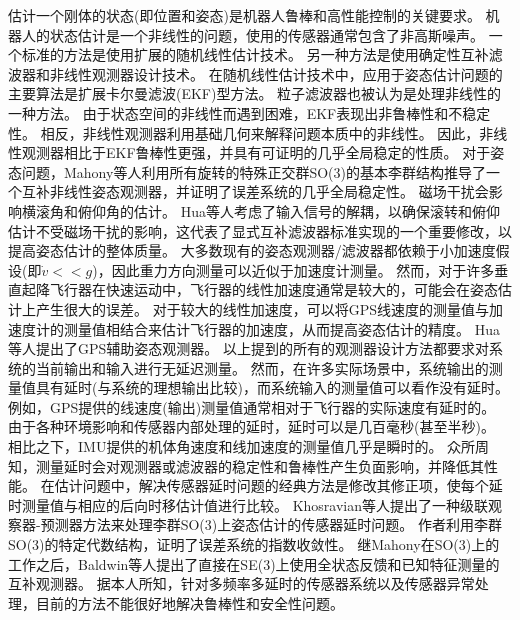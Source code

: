 \documentclass[
  type=master
]{gdutthesis}
\begin{document}
估计一个刚体的状态(即位置和姿态)是机器人鲁棒和高性能控制的关键要求。
机器人的状态估计是一个非线性的问题，使用的传感器通常包含了非高斯噪声\cite{baldwin2009inertial}。
一个标准的方法是使用扩展的随机线性估计技术\cite{lefferts1982kalman,barshan1995inertial}。
另一种方法是使用确定性互补滤波器和非线性观测器设计技术\cite{zimmermann1992high,baerveldt1997low,vik2001nonlinear}。
在随机线性估计技术中，应用于姿态估计问题的主要算法是扩展卡尔曼滤波(EKF)型方法。
粒子滤波器也被认为是处理非线性的一种方法\cite{cheng2004particle}。
由于状态空间的非线性而遇到困难，EKF表现出非鲁棒性和不稳定性\cite{crassidis2007survey}。
相反，非线性观测器利用基础几何来解释问题本质中的非线性。
因此，非线性观测器相比于EKF鲁棒性更强，并具有可证明的几乎全局稳定的性质\cite{thienel2003coupled,mahony2008nonlinear,lageman2009gradient,hua2010attitude,vasconcelos2010nonlinear}。
对于姿态问题，Mahony等人利用所有旋转的特殊正交群SO(3)的基本李群结构推导了一个互补非线性姿态观测器，并证明了误差系统的几乎全局稳定性\cite{mahony2008nonlinear}。
磁场干扰会影响横滚角和俯仰角的估计。
Hua等人考虑了输入信号的解耦，以确保滚转和俯仰估计不受磁场干扰的影响，这代表了显式互补滤波器标准实现的一个重要修改，以提高姿态估计的整体质量\cite{hua2011nonlinear}。
大多数现有的姿态观测器/滤波器都依赖于小加速度假设(即$\dot{v}<<g$)，因此重力方向测量可以近似于加速度计测量。
然而，对于许多垂直起降飞行器在快速运动中，飞行器的线性加速度通常是较大的，可能会在姿态估计上产生很大的误差。
对于较大的线性加速度，可以将GPS线速度的测量值与加速度计的测量值相结合来估计飞行器的加速度，从而提高姿态估计的精度。
Hua等人提出了GPS辅助姿态观测器\cite{hua2010attitude}。
以上提到的所有的观测器设计方法都要求对系统的当前输出和输入进行无延迟测量。
然而，在许多实际场景中，系统输出的测量值具有延时(与系统的理想输出比较)，而系统输入的测量值可以看作没有延时。
例如，GPS提供的线速度(输出)测量值通常相对于飞行器的实际速度有延时的。
由于各种环境影响和传感器内部处理的延时，延时可以是几百毫秒(甚至半秒)\cite{kingston2004real}。
相比之下，IMU提供的机体角速度和线加速度的测量值几乎是瞬时的。
众所周知，测量延时会对观测器或滤波器的稳定性和鲁棒性产生负面影响，并降低其性能\cite{battilotti2015nonlinear}。
在估计问题中，解决传感器延时问题的经典方法是修改其修正项，使每个延时测量值与相应的后向时移估计值进行比较。
Khosravian等人提出了一种级联观察器-预测器方法来处理李群SO(3)上姿态估计的传感器延时问题\cite{khosravian2016state}。
作者利用李群SO(3)的特定代数结构，证明了误差系统的指数收敛性。
继Mahony在SO(3)上的工作之后，Baldwin等人提出了直接在SE(3)上使用全状态反馈和已知特征测量的互补观测器\cite{baldwin2007complementary}。
据本人所知，针对多频率多延时的传感器系统以及传感器异常处理，目前的方法不能很好地解决鲁棒性和安全性问题。
\end{document}
